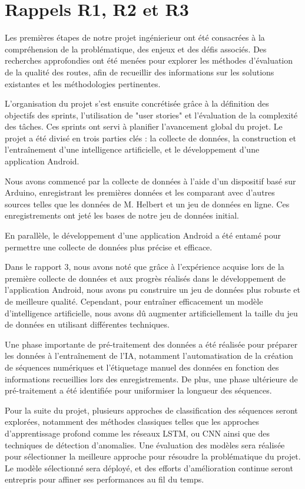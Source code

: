 \section{Rappels R1, R2 et R3}

Les premières étapes de notre projet ingénierieur ont été consacrées à la compréhension de la problématique, des enjeux et des défis associés. Des recherches approfondies ont été menées pour explorer les méthodes d'évaluation de la qualité des routes, afin de recueillir des informations sur les solutions existantes et les méthodologies pertinentes.

L'organisation du projet s'est ensuite concrétisée grâce à la définition des objectifs des sprints, l'utilisation de "user stories" et l'évaluation de la complexité des tâches. Ces sprints ont servi à planifier l'avancement global du projet. Le projet a été divisé en trois parties clés : la collecte de données, la construction et l'entraînement d'une intelligence artificielle, et le développement d'une application Android.

Nous avons commencé par la collecte de données à l'aide d'un dispositif basé sur Arduino, enregistrant les premières données et les comparant avec d'autres sources telles que les données de M. Helbert et un jeu de données en ligne. Ces enregistrements ont jeté les bases de notre jeu de données initial.

En parallèle, le développement d'une application Android a été entamé pour permettre une collecte de données plus précise et efficace. 

Dans le rapport 3, nous avons noté que grâce à l'expérience acquise lors de la première collecte de données et aux progrès réalisés dans le développement de l'application Android, nous avons pu construire un jeu de données plus robuste et de meilleure qualité. Cependant, pour entraîner efficacement un modèle d'intelligence artificielle, nous avons dû augmenter artificiellement la taille du jeu de données en utilisant différentes techniques.

Une phase importante de pré-traitement des données a été réalisée pour préparer les données à l'entraînement de l'IA, notamment l'automatisation de la création de séquences numériques et l'étiquetage manuel des données en fonction des informations recueillies lors des enregistrements. De plus, une phase ultérieure de pré-traitement a été identifiée pour uniformiser la longueur des séquences.

Pour la suite du projet, plusieurs approches de classification des séquences seront explorées, notamment des méthodes classiques telles que les approches d'apprentissage profond comme les réseaux LSTM, ou CNN ainsi que des techniques de détection d'anomalies. Une évaluation des modèles sera réalisée pour sélectionner la meilleure approche pour résoudre la problématique du projet. Le modèle sélectionné sera déployé, et des efforts d'amélioration continue seront entrepris pour affiner ses performances au fil du temps.
